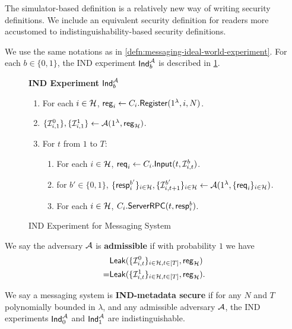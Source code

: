The simulator-based definition is a relatively new way of writing security definitions. We include an equivalent security definition for readers more accustomed to indistinguishability-based security definitions.
\begin{definition}
\label{defn:messaging-ind-experiment}
We use the same notations as in \cref{defn:messaging-ideal-world-experiment}. For each $b \in \{0, 1\}$, the IND experiment $\mathsf{Ind}_b^{\mathcal{A}}$ is described in \cref{expr:messaging-IND}.

\begin{figure}[!h]
\begin{framed}
\textbf{IND Experiment} $\mathsf{Ind}_b^{\mathcal{A}}$
\begin{enumerate}
\item For each $i \in \mathcal{H}$, $\mathsf{reg}_i \leftarrow C_i.\mathsf{Register}(1^{\lambda}, i, N)$. 
\item $\{\mathcal{I}^{0}_{i, 1}\}, \{\mathcal{I}^{1}_{i, 1}\} \leftarrow \mathcal{A}(1^{\lambda}, \mathsf{reg}_{\mathcal{H}})$.
\item For $t$ from $1$ to $T$:
    \begin{enumerate}
    \item For each $i \in \mathcal{H}$, $\mathsf{req}_i \leftarrow C_i.\mathsf{Input}(t, \mathcal{I}^{b}_{i, t})$.
    
    \item for $b'\in \{0, 1\}$, $\{\mathsf{resp}^{b'}_i\}_{i \in \mathcal{H}},\{\mathcal{I}^{b'}_{i, t + 1}\}_{i \in \mathcal{H}} \leftarrow \mathcal{A}(1^{\lambda}, \{\mathsf{req}_i\}_{i \in \mathcal{H}})$.
    
    \item For each $i \in \mathcal{H}$, $C_i.\mathsf{ServerRPC}(t, \mathsf{resp}^{b}_i)$.
    \end{enumerate}
\end{enumerate}
\end{framed}
\caption{IND Experiment for Messaging System}
\label{expr:messaging-IND}
\end{figure}

We say the adversary $\mathcal{A}$ is \textbf{admissible} if with probability $1$ we have
\begin{align*}
&\mathsf{Leak}(\{\mathcal{I}^{0}_{i, t}\}_{i \in \mathcal{H}, t \in [T]}, \mathsf{reg}_{\mathcal{H}}) \\
= &\mathsf{Leak}(\{\mathcal{I}^{1}_{i, t}\}_{i \in \mathcal{H}, t \in [T]}, \mathsf{reg}_{\mathcal{H}}).    
\end{align*}
\end{definition}
\begin{definition}
\label{defn:messaging-IND-security}
We say a messaging system is \textbf{IND-metadata secure} if for any $N$ and $T$ polynomially bounded in $\lambda$, and any admissible adversary $\mathcal{A}$, the IND experiments $\mathsf{Ind}_0^{\mathcal{A}}$ and $\mathsf{Ind}_1^{\mathcal{A}}$ are indistinguishable.
\end{definition}

